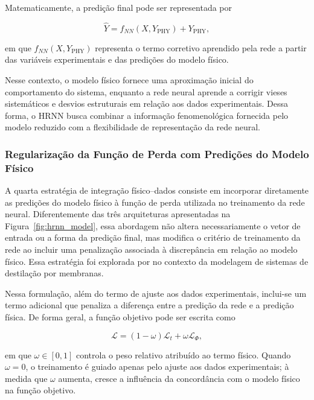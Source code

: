 Matematicamente, a predição final pode ser representada por

\begin{equation}
\hat{Y} = f_{NN}(X, Y_{\text{PHY}}) + Y_{\text{PHY}},
\end{equation}

\noindent em que \(f_{NN}(X, Y_{\text{PHY}})\) representa o termo corretivo aprendido pela rede a partir das variáveis experimentais e das predições do modelo físico.

Nesse contexto, o modelo físico fornece uma aproximação inicial do comportamento do sistema, enquanto a rede neural aprende a corrigir vieses sistemáticos e desvios estruturais em relação aos dados experimentais. Dessa forma, o HRNN busca combinar a informação fenomenológica fornecida pelo modelo reduzido com a flexibilidade de representação da rede neural.

\subsubsection{Regularização da Função de Perda com Predições do Modelo Físico}

A quarta estratégia de integração físico--dados consiste em incorporar diretamente as predições do modelo físico à função de perda utilizada no treinamento da rede neural. Diferentemente das três arquiteturas apresentadas na Figura~\ref{fig:hrnn_model}, essa abordagem não altera necessariamente o vetor de entrada ou a forma da predição final, mas modifica o critério de treinamento da rede ao incluir uma penalização associada à discrepância em relação ao modelo físico. Essa estratégia foi explorada por \cite{seixo2024internship} no contexto da modelagem de sistemas de destilação por membranas.

Nessa formulação, além do termo de ajuste aos dados experimentais, inclui-se um termo adicional que penaliza a diferença entre a predição da rede e a predição física. De forma geral, a função objetivo pode ser escrita como

\begin{equation}
\mathcal{L} = (1-\omega)\mathcal{L}_{t} + \omega \mathcal{L}_{\Phi},
\end{equation}

\noindent em que \(\omega \in [0,1]\) controla o peso relativo atribuído ao termo físico. Quando \(\omega = 0\), o treinamento é guiado apenas pelo ajuste aos dados experimentais; à medida que \(\omega\) aumenta, cresce a influência da concordância com o modelo físico na função objetivo.

